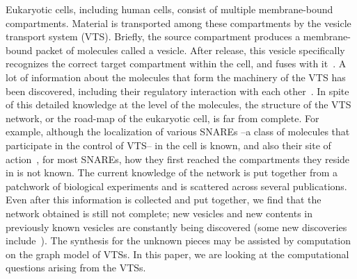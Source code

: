 
Eukaryotic cells, including human cells, consist of multiple membrane-bound compartments.
%
Material is transported among these compartments by the vesicle
transport system (VTS).
%
Briefly, the source compartment produces a membrane-bound packet of
molecules called a vesicle.
%
After release, this vesicle specifically recognizes the correct target
compartment within the cell, and fuses with it~\cite{alberts2013essential}.
%
A lot of information about the molecules that form the machinery of
the VTS has been discovered, including their regulatory interaction
with each other~\cite{bonifacino2004mechanisms}. 
%
In spite of this detailed knowledge at the level of the molecules, the
structure of the VTS network, or the road-map of the eukaryotic cell,
is far from complete.
%
For example, although the localization of various SNAREs --a class of
molecules that participate in the control of VTS-- in the cell is
known, and also their site of action~\cite{hong2014tethering}, for
most SNAREs, how they first reached the compartments they reside in is
not known.
%
The current knowledge of the network is put together from a patchwork
of biological experiments and is scattered across several publications.
%
Even after this information is collected and put together, we find
that the network obtained is still not complete; new vesicles and new
contents in previously known vesicles are constantly being discovered
(some new discoveries include~\cite{chanaday2017you, d2017tethering,
rodepeter2017indication, zhao2017conserved}).
%
The synthesis for the unknown pieces may be assisted by computation on
the graph model of VTSs.
%
% 
%
%
%
%
%
In this paper, we are looking at the computational questions 
arising from the VTSs.


